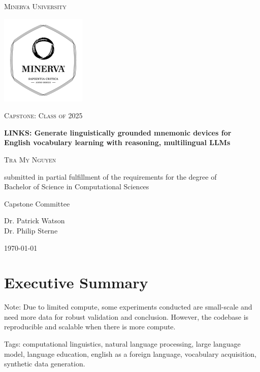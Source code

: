 
\begin{titlepage}
\centering
{\scshape\LARGE Minerva University \par}
\vspace{1cm}
\begin{center}
  \includegraphics[width=0.4\linewidth]{figures/minerva_logo.pdf}
\end{center}
{\scshape\Large Capstone: Class of 2025 \par}
\vspace{1.5cm}
{\huge\bfseries LINKS: Generate linguistically grounded mnemonic devices for English vocabulary learning with reasoning, multilingual LLMs \par}
\vspace{2cm}
{\scshape\large Tra My Nguyen \par}

\vfill
submitted in partial fulfillment of the requirements for the degree of \\ Bachelor of Science in Computational Sciences \par
\vspace{2cm}
{\large Capstone Committee \par}
Dr. Patrick Watson \\
Dr. Philip Sterne \\
\vspace{2cm}
{\large \today\par}
\end{titlepage}

\onecolumn
\section*{Executive Summary}
Note: Due to limited compute, some experiments conducted are small-scale and need more data for robust validation and conclusion. However, the codebase is reproducible and scalable when there is more compute.

Tags: computational linguistics, natural language processing, large language model, language education, english as a foreign language, vocabulary acquisition, synthetic data generation.

\clearpage

\tableofcontents
